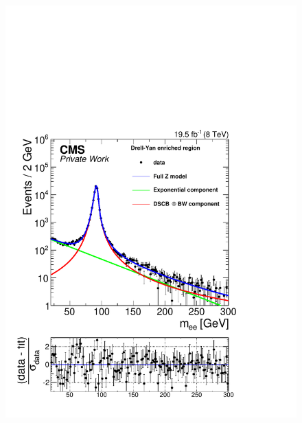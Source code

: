 \begin{figure}[htbp]
\centering
\begin{minipage}[t]{0.49\textwidth}
  \includegraphics[width=\textwidth]{plots/results/fit/expoFitEE_Log_Central.pdf}
\end{minipage}
\begin{minipage}[t]{0.49\textwidth}

\end{minipage}
\end{figure}
